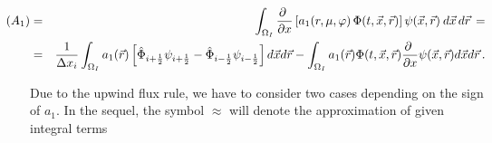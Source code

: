 \documentclass[11pt]{article}
\newcommand{\ot}{\frac{1}{2}}
\begin{document}
{\small
\begin{eqnarray*}
\hspace{-20pt} 
(A_{1}) 
& = &
\int_{\Omega_{I}}
\frac{\partial \mbox{ }}{\partial x} 
\left[ a_{1}(r,\mu,\varphi) \, \Phi(t,\vec{x},\vec{r}) \right] 
\psi(\vec{x},\vec{r}) \: d\vec{x} \, d\vec{r} \, = \\
& = & 
\dfrac{1}{\Delta x_{i}}
\int_{\Omega_{I}}  
a_{1}(\vec{r})
\left[ 
\hat{\Phi}_{i + \ot} 
\psi_{i + \ot} 
-
\hat{\Phi}_{i - \ot} 
\psi_{i - \ot} \right]  
d\vec{x} d\vec{r}
-
\int_{\Omega_{I}}
a_{1}(\vec{r}) \Phi(t,\vec{x},\vec{r})
\frac{\partial \mbox{ }}{\partial x} 
\psi(\vec{x},\vec{r}) d\vec{x} d\vec{r} \, .
\end{eqnarray*}
}

%
Due to the upwind flux rule, we have to consider two cases 
depending on the sign of $a_1$. In the sequel, the symbol $\approx$ will denote the approximation of given integral terms
\end{document}
